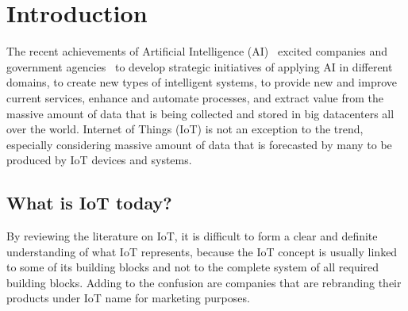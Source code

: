 \documentclass[english, 12pt, a4paper, elec, utf8, online]{aaltothesis}
\begin{document}
\cleardoublepage

\section{Introduction}
\thispagestyle{empty}
The recent achievements of Artificial Intelligence (AI)~\cite{tan_lim_2018}  excited companies and government agencies~\cite{temreport2017} to develop strategic initiatives of applying AI in different domains, to create new types of intelligent systems, to provide new and improve current services, enhance and automate processes, and extract value from the massive amount of data that is being collected and stored in big datacenters all over the world. Internet of Things (IoT) is not an exception to the trend, especially considering massive amount of data that is forecasted by many to be produced by IoT devices and systems.

\subsection{What is IoT today?}
By reviewing the literature on IoT, it is difficult to form a clear and definite understanding of what IoT represents, because the IoT concept is usually linked to some of its building blocks and not to the complete system of all required building blocks. Adding to the confusion are companies that are rebranding their products under IoT name for marketing purposes.~\cite{AtzoriIM17}
\end{document}
